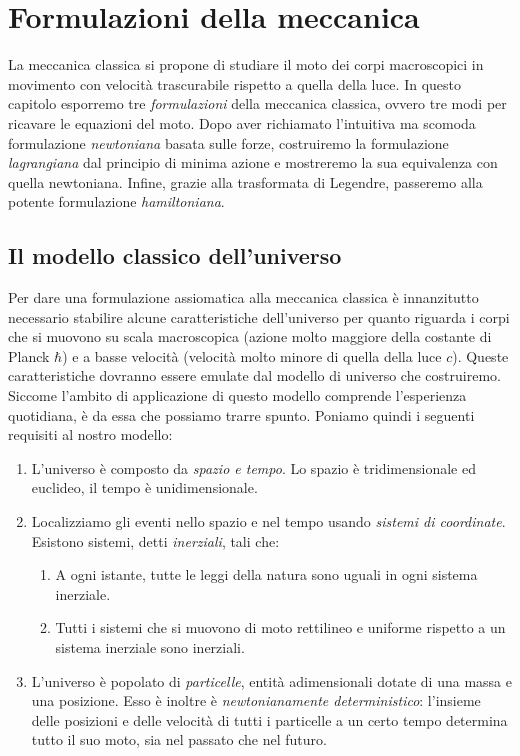 \chapter{Formulazioni della meccanica}
La meccanica classica si propone di studiare il moto dei corpi macroscopici in movimento con velocità trascurabile rispetto a quella della luce. In questo capitolo esporremo tre \emph{formulazioni} della meccanica classica, ovvero tre modi per ricavare le equazioni del moto. Dopo aver richiamato l'intuitiva ma scomoda formulazione \emph{newtoniana} basata sulle forze, costruiremo la formulazione \emph{lagrangiana} dal principio di minima azione e mostreremo la sua equivalenza con quella newtoniana. Infine, grazie alla trasformata di Legendre, passeremo alla potente formulazione \emph{hamiltoniana}.

\section{Il modello classico dell'universo}
Per dare una formulazione assiomatica alla meccanica classica è innanzitutto necessario stabilire alcune caratteristiche dell'universo per quanto riguarda i corpi che si muovono su scala macroscopica (azione molto maggiore della costante di Planck $\hbar$) e a basse velocità (velocità molto minore di quella della luce $c$). Queste caratteristiche dovranno essere emulate dal modello di universo che costruiremo. Siccome l'ambito di applicazione di questo modello comprende l'esperienza quotidiana, è da essa che possiamo trarre spunto. Poniamo quindi i seguenti requisiti al nostro modello:
\begin{enumerate}
  \item L'universo è composto da \emph{spazio e tempo}. Lo spazio è tridimensionale ed euclideo, il tempo è unidimensionale.
  \item Localizziamo gli eventi nello spazio e nel tempo usando \emph{sistemi di coordinate}. Esistono sistemi, detti \emph{inerziali}, tali che:
  \begin{enumerate}
    \item A ogni istante, tutte le leggi della natura sono uguali in ogni sistema inerziale.
    \item Tutti i sistemi che si muovono di moto rettilineo e uniforme rispetto a un sistema inerziale sono inerziali.
  \end{enumerate}
  \item L'universo è popolato di \emph{particelle}, entità adimensionali dotate di una massa e una posizione. Esso è inoltre è \emph{newtonianamente deterministico}: l'insieme delle posizioni e delle velocità di tutti i particelle a un certo tempo determina tutto il suo moto, sia nel passato che nel futuro.
\end{enumerate}


